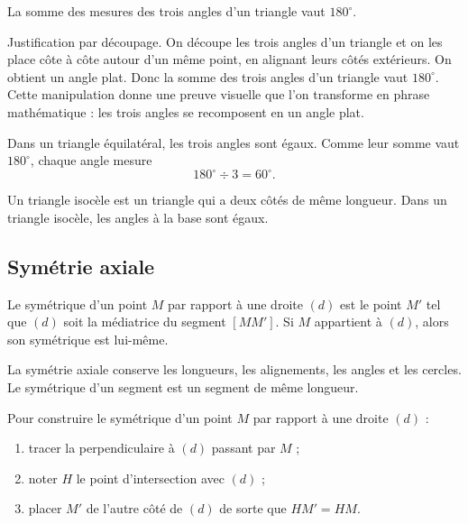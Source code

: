 \documentclass[11pt,a4paper]{article}
\begin{document}
\begin{theobox}
La somme des mesures des trois angles d'un triangle vaut \(180^\circ\).
\end{theobox}

\begin{preuvebox}
Justification par découpage. On découpe les trois angles d'un triangle et on les place côte à côte autour d'un même point, en alignant leurs côtés extérieurs. On obtient un angle plat. Donc la somme des trois angles d'un triangle vaut \(180^\circ\). Cette manipulation donne une preuve visuelle que l'on transforme en phrase mathématique : les trois angles se recomposent en un angle plat.
\end{preuvebox}

\begin{proprbox}
Dans un triangle équilatéral, les trois angles sont égaux. Comme leur somme vaut \(180^\circ\), chaque angle mesure
\[
180^\circ\div3=60^\circ.
\]
\end{proprbox}

\begin{definitionbox}
Un triangle isocèle est un triangle qui a deux côtés de même longueur. Dans un triangle isocèle, les angles à la base sont égaux.
\end{definitionbox}

\subsection{Symétrie axiale}

\begin{definitionbox}
Le symétrique d'un point \(M\) par rapport à une droite \((d)\) est le point \(M'\) tel que \((d)\) soit la médiatrice du segment \([MM']\). Si \(M\) appartient à \((d)\), alors son symétrique est lui-même.
\end{definitionbox}

\begin{proprbox}
La symétrie axiale conserve les longueurs, les alignements, les angles et les cercles. Le symétrique d'un segment est un segment de même longueur.
\end{proprbox}

\begin{methodbox}
Pour construire le symétrique d'un point \(M\) par rapport à une droite \((d)\) :
\begin{enumerate}[label=\arabic*)]
\item tracer la perpendiculaire à \((d)\) passant par \(M\) ;
\item noter \(H\) le point d'intersection avec \((d)\) ;
\item placer \(M'\) de l'autre côté de \((d)\) de sorte que \(HM'=HM\).
\end{enumerate}
\end{methodbox}
\end{document}
